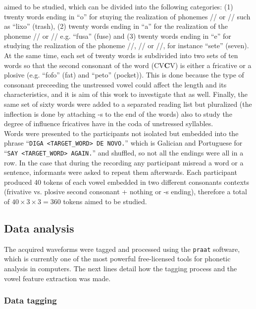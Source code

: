 \documentclass[a4paper,11pt]{article}
\begin{document}
aimed to be studied, which can be divided into the following categories: (1) twenty words ending in ``o'' for stuying the realization of phonemes // or // such as ``lixo'' (trash), (2) twenty words ending in ``a'' for the realization of the phoneme // or // e.g. ``fusa'' (fuse) and (3) twenty words ending in ``e'' for studying the realization of the phoneme //,  // or //, for instance ``sete'' (seven). At the same time, each set of twenty words is subdivided into two sets of ten words so that the second consonant of the word (CV\textbf{C}V) is either a fricative or a plosive (e.g. ``fofo'' (fat) and ``peto'' (pocket)). This is done because the  type of consonant preceeding the unstressed vowel could affect the length and its characteristics, and it is aim of this work to investigate that as well. Finally, the same set of sixty words were added to a separated reading list but pluralized (the inflection is done by attaching -s to the end of the words) also to study the degree of influence fricatives have in the coda of unstressed syllables.\\
     
     Words were presented to the participants not isolated but embedded into the phrase ``\texttt{DIGA <TARGET\string_WORD> DE NOVO.}'' which is Galician and Portuguese for ``\texttt{SAY <TARGET\string_WORD> AGAIN.}'' and shuffled, so not all the endings were all in a row. In the case that during the recording any participant misread a word or a sentence, informants were asked to repeat them afterwards. Each participant produced 40 tokens of each vowel embedded in two different consonants contexts (frivative vs. plosive second consonant + nothing or -s ending), therefore a total of $40\times 3\times 3 = 360$ tokens aimed to be studied.
     
     \subsection{Data analysis}
     
     The acquired waveforms were tagged and processed using the \texttt{praat} \cite{Boersma2009} software, which is currently one of the most powerful free-licensed tools for phonetic analysis in computers. The next lines detail how the tagging process and the vowel feature extraction was made.
     
     \subsubsection{Data tagging}
     
\end{document}
